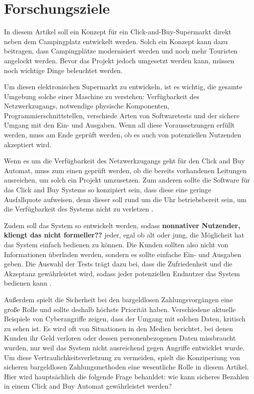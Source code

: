 \section{Forschungsziele}


In diesem Artikel soll ein Konzept für ein Click-and-Buy-Supermarkt direkt neben dem Campingplatz 
entwickelt werden. Solch ein Konzept kann dazu beitragen, dass Campingplätze modernisiert werden 
und noch mehr Touristen angelockt werden. Bevor das Projekt jedoch umgesetzt werden kann, müssen 
noch wichtige Dinge beleuchtet werden. 

Um diesen elektronischen Supermarkt zu entwickeln, ist es wichtig, die gesamte Umgebung solche einer Maschine
zu verstehen: Verfügbarkeit des Netzwerkzugangs, notwendige physische Komponenten, Programmierschnittstellen,
verschiede Arten von Softwaretests und der sichere Umgang mit den Ein- und Ausgaben. Wenn all diese 
Voraussetzungen erfüllt werden, muss am Ende geprüft werden, ob es auch von potenziellen Nutzenden 
akzeptiert wird. 

Wenn es um die Verfügbarkeit des Netzwerkzugangs geht für den Click and Buy Automat, muss zum einen 
geprüft werden, ob die bereits vorhandenen Leitungen ausreichen, um solch ein Projekt umzusetzen. Zum anderen 
sollte die Software für das Click and Buy Systems so konzipiert sein, dass diese eine geringe Ausfallquote
aufweisen, denn dieser soll rund um die Uhr betriebsbereit sein, um die Verfügbarkeit des Systems nicht zu
verletzen \cite{refbook:SWIS}.

Zudem soll das System so entwickelt werden, sodass \textbf{nonnativer Nutzender, kliengt das nicht 
formeller??} jeder, egal ob alt oder jung, die Möglicheit hat das System einfach bedienen zu können. 
Die Kunden sollten also nicht von Informationen überladen werden, sondern es sollte einfache Ein- 
und Ausgaben geben. Die Auswahl der Tests trägt dazu bei, dass die Zufriedenheit
und die Akzeptanz gewährleistet wird, sodass jeder potenziellen Endnutzer das System bedienen kann
\cite{refbook:IASE}.

Außerdem spielt die Sicherheit bei den bargeldlosen Zahlungsvorgängen eine große Rolle und sollte deshalb 
höchste Priorität haben. Verschiedene aktuelle Beispiele von Cyberangriffe zeigen, dass der Umgang mit solchen 
Daten, kritisch zu sehen ist. Es wird oft von Situationen in den Medien berichtet, bei denen Kunden ihr
Geld verloren oder dessen personenbezogenen Daten missbraucht wurden, nur weil das System nicht ausreichend 
gegen Angriffe entwicklet wurde. Um diese Vertraulichkeitsverletzung zu vermeiden, spielt die Konziperiung 
von sicheren bargeldlosen Zahlungsmethoden eine wesentliche Rolle in diesem Artikel. Hier wird hauptsächlich
die folgende Frage behanldet: wie kann sicheres Bezahlen in einem Click and Buy Automat gewährleistet werden?